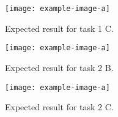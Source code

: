 \documentclass[tp]{lcc}
\begin{document}
\begin{figure}[h]
    \centering
    \texttt{[image: example-image-a]}
    \caption{Expected result for task 1 C.}
    \label{fig:task1c}
\end{figure}

\begin{figure}[h]
    \centering
    \texttt{[image: example-image-a]}
    \caption{Expected result for task 2 B.}
    \label{fig:task2b}
\end{figure}

\begin{figure}[h]
    \centering
    \texttt{[image: example-image-a]}
    \caption{Expected result for task 2 C.}
    \label{fig:task2c}
\end{figure}
\end{document}
